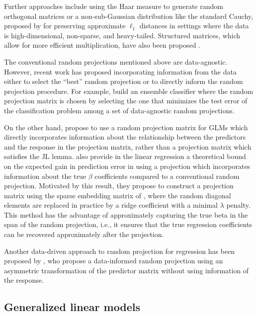 \documentclass[
  article,
  nojss]{jss}
\begin{document}
Further approaches include using the Haar measure to generate random
orthogonal matrices \citep{cannings2017random} or a non-sub-Gaussian
distribution like the standard Cauchy, proposed by
\citet{LiHastie2006VerySparseRP} for preserving approximate \(\ell_1\)
distances in settings where the data is high-dimensional, non-sparse,
and heavy-tailed. Structured matrices, which allow for more efficient
multiplication, have also been proposed \citep[see
e.g.,][]{ailon2009fast, Clarkson2013LowRankApprox}.

The conventional random projections mentioned above are data-agnostic.
However, recent work has proposed incorporating information from the
data either to select the ``best'' random projection or to directly
inform the random projection procedure. For example,
\citet{cannings2017random} build an ensemble classifier where the random
projection matrix is chosen by selecting the one that minimizes the test
error of the classification problem among a set of data-agnostic random
projections.

On the other hand, \citet{parzer2024glms} propose to use a random
projection matrix for GLMs which directly incorporates information about
the relationship between the predictors and the response in the
projection matrix, rather than a projection matrix which satisfies the
JL lemma. \citet{parzer2024sparse} also provide in the linear regression
a theoretical bound on the expected gain in prediction error in using a
projection which incorporates information about the true \(\beta\)
coefficients compared to a conventional random projection. Motivated by
this result, they propose to construct a projection matrix using the
sparse embedding matrix of \citet{Clarkson2013LowRankApprox}, where the
random diagonal elements are replaced in practice by a ridge coefficient
with a minimal \(\lambda\) penalty. This method has the advantage of
approximately capturing the true beta in the span of the random
projection, i.e., it ensures that the true regression coefficients can
be recovered approximately after the projection.

Another data-driven approach to random projection for regression has
been proposed by \citet{ryder2019asymmetric}, who propose a
data-informed random projection using an asymmetric transformation of
the predictor matrix without using information of the response.

\subsection{Generalized linear models}\label{generalized-linear-models}
\end{document}
